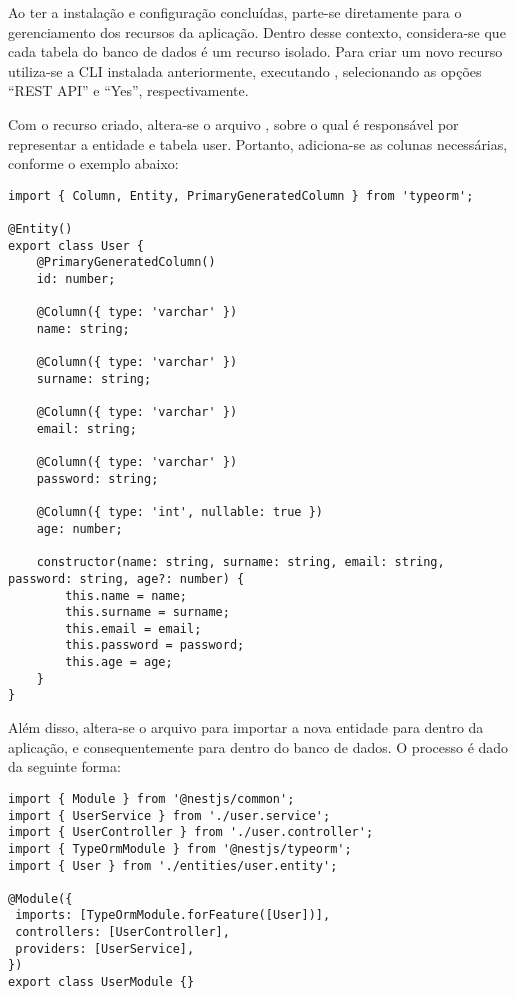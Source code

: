 Ao ter a instalação e configuração concluídas, parte-se diretamente para o gerenciamento dos recursos da aplicação. Dentro desse contexto, considera-se que cada tabela do banco de dados é um recurso isolado. Para criar um novo recurso utiliza-se a CLI instalada anteriormente, executando , selecionando as opções “REST API” e “Yes”, respectivamente.

Com o recurso criado, altera-se o arquivo , sobre o qual é responsável por representar a entidade e tabela user. Portanto, adiciona-se as colunas necessárias, conforme o exemplo abaixo:
\begin{lstlisting}
import { Column, Entity, PrimaryGeneratedColumn } from 'typeorm';

@Entity()
export class User {
    @PrimaryGeneratedColumn()
    id: number;

    @Column({ type: 'varchar' })
    name: string;

    @Column({ type: 'varchar' })
    surname: string;

    @Column({ type: 'varchar' })
    email: string;

    @Column({ type: 'varchar' })
    password: string;

    @Column({ type: 'int', nullable: true })
    age: number;

    constructor(name: string, surname: string, email: string, password: string, age?: number) {
        this.name = name;
        this.surname = surname;
        this.email = email;
        this.password = password;
        this.age = age;
    }
}
\end{lstlisting}

Além disso, altera-se o arquivo  para importar a nova entidade para dentro da aplicação, e consequentemente para dentro do banco de dados. O processo é dado da seguinte forma:
\begin{lstlisting}
import { Module } from '@nestjs/common';
import { UserService } from './user.service';
import { UserController } from './user.controller';
import { TypeOrmModule } from '@nestjs/typeorm';
import { User } from './entities/user.entity';

@Module({
 imports: [TypeOrmModule.forFeature([User])],
 controllers: [UserController],
 providers: [UserService],
})
export class UserModule {}
\end{lstlisting}

